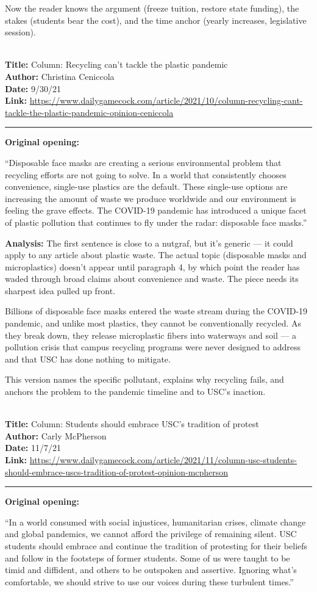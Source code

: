 \documentclass[12pt]{article}
\newcounter{examplenum}
\newcommand{\totalexamples}{10}
\newcommand{\exampleheader}[4]{%
    \newpage
    \stepcounter{examplenum}%
    \noindent{\large\bfseries\color{garnet} Example \theexamplenum\ of \totalexamples}\\[6pt]
    \textbf{Title:} #1\\
    \textbf{Author:} #2\\
    \textbf{Date:} #3\\
    \textbf{Link:} \url{#4}\\[4pt]
    \noindent\rule{\textwidth}{0.4pt}
    \vspace{6pt}
}
\begin{document}
Now the reader knows the argument (freeze tuition, restore state funding), the stakes (students bear the cost), and the time anchor (yearly increases, legislative session).

\exampleheader{Column: Recycling can't tackle the plastic pandemic}{Christina Ceniccola}{9/30/21}{https://www.dailygamecock.com/article/2021/10/column-recycling-cant-tackle-the-plastic-pandemic-opinion-ceniccola}

\begin{promptbox}
\textbf{Original opening:}

``Disposable face masks are creating a serious environmental problem that recycling efforts are not going to solve. In a world that consistently chooses convenience, single-use plastics are the default. These single-use options are increasing the amount of waste we produce worldwide and our environment is feeling the grave effects. The COVID-19 pandemic has introduced a unique facet of plastic pollution that continues to fly under the radar: disposable face masks.''
\end{promptbox}

\textbf{Analysis:} The first sentence is close to a nutgraf, but it's generic --- it could apply to any article about plastic waste. The actual topic (disposable masks and microplastics) doesn't appear until paragraph 4, by which point the reader has waded through broad claims about convenience and waste. The piece needs its sharpest idea pulled up front.

\begin{seasonbox}
Billions of disposable face masks entered the waste stream during the COVID-19 pandemic, and unlike most plastics, they cannot be conventionally recycled. As they break down, they release microplastic fibers into waterways and soil --- a pollution crisis that campus recycling programs were never designed to address and that USC has done nothing to mitigate.
\end{seasonbox}

This version names the specific pollutant, explains why recycling fails, and anchors the problem to the pandemic timeline and to USC's inaction.

\exampleheader{Column: Students should embrace USC's tradition of protest}{Carly McPherson}{11/7/21}{https://www.dailygamecock.com/article/2021/11/column-usc-students-should-embrace-uscs-tradition-of-protest-opinion-mcpherson}

\begin{promptbox}
\textbf{Original opening:}

``In a world consumed with social injustices, humanitarian crises, climate change and global pandemics, we cannot afford the privilege of remaining silent. USC students should embrace and continue the tradition of protesting for their beliefs and follow in the footsteps of former students. Some of us were taught to be timid and diffident, and others to be outspoken and assertive. Ignoring what's comfortable, we should strive to use our voices during these turbulent times.''
\end{promptbox}
\end{document}
